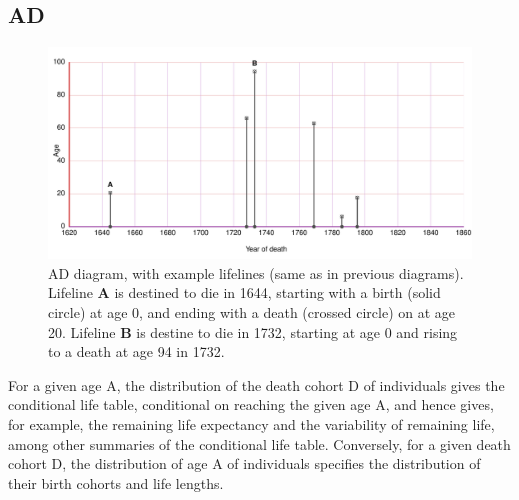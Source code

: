 \documentclass{bmcart}
\begin{document}
\FloatBarrier
\subsection*{AD}

\begin{figure}
\centering
\includegraphics[scale=.6]{Figures/ADdiagram.pdf}
\caption{AD diagram, with example lifelines (same as in previous diagrams). Lifeline \textbf{A} is destined to die in 1644, starting with a birth (solid circle) at age 0, and ending with a death (crossed circle) on at age 20. Lifeline \textbf{B} is destine to die in 1732, starting at age 0 and rising to a death at age 94 in 1732.}
\label{fig:tcd}
\end{figure}
For a given age A, the distribution of the death cohort D of individuals gives the conditional life table, conditional on reaching the given age A, and hence gives, for example, the remaining life expectancy and the variability of remaining life, among other summaries of the
conditional life table. Conversely, for a given death cohort D, the distribution of age A of individuals specifies the distribution of their birth cohorts and life lengths.
\end{document}
